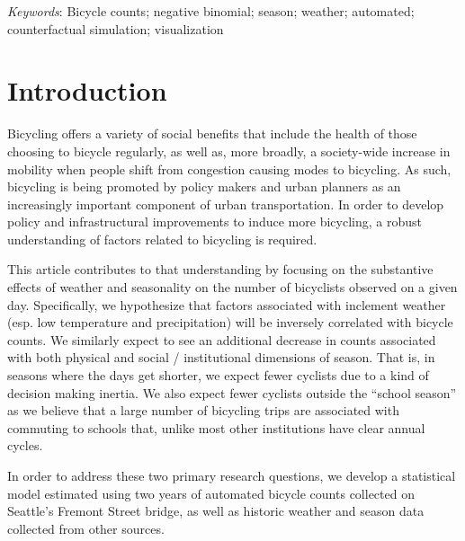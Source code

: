 \documentclass[12pt,letterpaper,article]{memoir}
\begin{document}
\vspace*{5pc}
\par\noindent\textit{Keywords}: Bicycle counts; negative binomial; season; weather; automated; counterfactual simulation; visualization

\clearpage


\chapter*{Introduction}
%
% 

Bicycling offers a variety of social benefits that include the health
of those choosing to bicycle regularly, as well as, more broadly, a
society-wide increase in mobility when people shift from congestion
causing modes to bicycling. As such, bicycling is being promoted by
policy makers and urban planners as an increasingly important
component of urban transportation. In order to develop policy and
infrastructural improvements to induce more bicycling, a robust
understanding of factors related to bicycling is required.

This article contributes to that understanding by focusing on the
substantive effects of weather and seasonality on the number of
bicyclists observed on a given day. Specifically, we hypothesize that
factors associated with inclement weather (esp. low temperature and
precipitation) will be inversely correlated with bicycle counts. We
similarly expect to see an additional decrease in counts associated
with both physical and social / institutional dimensions of
season. That is, in seasons where the days get shorter, we expect
fewer cyclists due to a kind of decision making inertia. We also
expect fewer cyclists outside the ``school season'' as we believe that
a large number of bicycling trips are associated with commuting to
schools that, unlike most other institutions have clear annual cycles.

In order to address these two primary research questions, we develop a
statistical model estimated using two years of automated bicycle
counts collected on Seattle's Fremont Street bridge, as well as
historic weather and season data collected from other sources.
\end{document}

